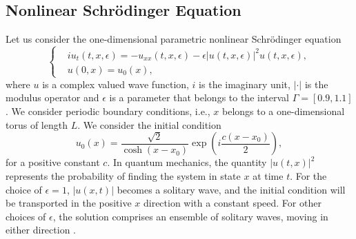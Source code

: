 \subsection{Nonlinear Schr\"odinger Equation} \label{chap:NuRe:1.2} Let us consider the one-dimensional parametric nonlinear Schr\"odinger equation
\begin{equation} \label{eq:NuRe:10}
\left\{
\begin{aligned}
	& i u_t(t,x,\epsilon) = - u_{xx}(t,x,\epsilon) - \epsilon |u(t,x,\epsilon)|^2 u(t,x,\epsilon),\\
	& u(0,x) = u_0(x),
\end{aligned}
\right.
\end{equation}
where $u$ is a complex valued wave function, $i$ is the imaginary unit, $|\cdot|$ is the modulus operator and $\epsilon$ is a parameter that belongs to the interval $\Gamma = [0.9,1.1]$. We consider periodic boundary conditions, i.e., $x$ belongs to a one-dimensional torus of length $L$. We consider the initial condition
\begin{equation} \label{eq:NuRe:11}
	u_0(x) = \frac{\sqrt 2}{\cosh(x - x_0)} \exp(i\frac{c(x-x_0)}{2}),
\end{equation}
for a positive constant $c$. In quantum mechanics, the quantity $|u(t,x)|^2$ represents the probability of finding the system in state $x$ at time $t$. For the choice of $\epsilon = 1$, $|u(x,t)|$ becomes a solitary wave, and the initial condition will be transported in the positive $x$ direction with a constant speed. For other choices of $\epsilon$, the solution comprises an ensemble of solitary waves, moving in either direction \cite{faou2012geometric}. 

